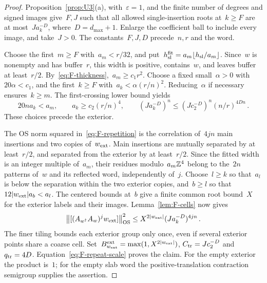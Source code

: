 \begin{proof}
Proposition~\ref{prop:U3}(a), with~$\varepsilon=1$, and the finite number of degrees and signed images give~$F,J$ such that all allowed single-insertion roots at~$k\ge F$ are at most~$Ja_k^{-D}$, where~$D=d_{\max}+1$. Enlarge the coefficient ball to include every image, and take~$J>0$. The constants~$F,J,D$ precede~$n,r$ and the word.

Choose the first~$m\ge F$ with~$a_m<r/32$, and put~$h_{\rm sl}^{\rm fit}=a_m\lfloor h_{\rm sl}/a_m\rfloor$. Since~$w$ is nonempty and has buffer~$r$, this width is positive, contains~$w$, and leaves buffer at least~$r/2$. By~\eqref{eq:F-thickness},~$a_m\ge c_1r^2$. Choose a fixed small~$\alpha>0$ with~$20\alpha<c_1$, and the first~$k\ge F$ with~$a_k<\alpha(r/n)^2$. Reducing~$\alpha$ if necessary ensures~$k\ge m$. The first-crossing lower bound yields
\begin{equation}\label{eq:F-repeat-scale}
20na_k<a_m,\qquad a_k\ge c_2(r/n)^4,\qquad (Ja_k^{-D})^n\le (Jc_2^{-D})^n(n/r)^{4Dn}\,.
\end{equation}
These choices precede the exterior.

The OS norm squared in~\eqref{eq:F-repetition} is the correlation of~$4jn$ main insertions and two copies of~$w_{\rm ext}$. Main insertions are mutually separated by at least~$r/2$, and separated from the exterior by at least~$r/2$. Since the fitted width is an integer multiple of~$a_m$, their residues modulo~$a_m\mathbb{Z}^4$ belong to the~$2n$ patterns of~$w$ and its reflected word, independently of~$j$. Choose~$l\ge k$ so that~$a_l$ is below the separation within the two exterior copies, and~$b\ge l$ so that~$12|w_{\rm ext}|a_b<a_l$. The centered bounds at~$b$ give a finite common root bound~$X$ for the exterior labels and their images. Lemma~\ref{lem:F-cells} now gives
\begin{equation*}
\big\|[(A_{w^\dagger}A_w)^jw_{\rm ext}]\big\|_{\rm OS}^2
\le X^{2|w_{\rm ext}|}(Ja_k^{-D})^{4jn}\,.
\end{equation*}
The finer tiling bounds each exterior group only once, even if several exterior points share a coarse cell. Set~$B_{w_{\rm ext}}^{\rm ext}=\max(1,X^{2|w_{\rm ext}|})$, $C_{\rm tr}=Jc_2^{-D}$ and~$q_{\rm tr}=4D$. Equation~\eqref{eq:F-repeat-scale} proves the claim. For the empty exterior the product is~$1$; for the empty slab word the positive-translation contraction semigroup supplies the assertion.
\end{proof}

